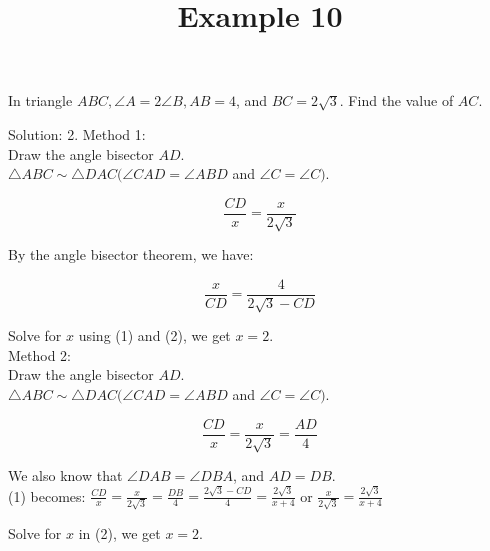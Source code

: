 \documentclass{article}
\title{Example 10}
\date{}
\begin{document}
\maketitle

In triangle \(A B C, \angle A=2 \angle B, A B=4\), and \(B C=2 \sqrt{3}\). Find the value of \(A C\).

Solution: 2.
Method 1:\\
Draw the angle bisector \(A D\).\\
\(\triangle A B C \sim \triangle D A C(\angle C A D=\angle A B D\) and \(\angle C=\angle C)\).

\[
\frac{C D}{x}=\frac{x}{2 \sqrt{3}}
\]

By the angle bisector theorem, we have:

\[
\frac{x}{C D}=\frac{4}{2 \sqrt{3}-C D}
\]

Solve for \(x\) using (1) and (2), we get \(x=2\).\\
Method 2:\\
Draw the angle bisector \(A D\).\\
\(\triangle A B C \sim \triangle D A C(\angle C A D=\angle A B D\) and \(\angle C=\angle C)\).

\[
\frac{C D}{x}=\frac{x}{2 \sqrt{3}}=\frac{A D}{4}
\]

We also know that \(\angle D A B=\angle D B A\), and \(A D=D B\).\\
(1) becomes: \(\frac{C D}{x}=\frac{x}{2 \sqrt{3}}=\frac{D B}{4}=\frac{2 \sqrt{3}-C D}{4}=\frac{2 \sqrt{3}}{x+4}\) or \(\frac{x}{2 \sqrt{3}}=\frac{2 \sqrt{3}}{x+4}\)

Solve for \(x\) in (2), we get \(x=2\).\\
\end{document}
